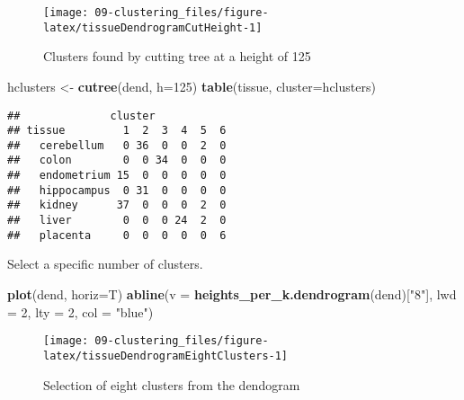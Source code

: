 \documentclass[]{book}
\newenvironment{Shaded}{\begin{snugshade}}{\end{snugshade}}
\newcommand{\KeywordTok}[1]{\textcolor[rgb]{0.13,0.29,0.53}{\textbf{{#1}}}}
\newcommand{\DataTypeTok}[1]{\textcolor[rgb]{0.13,0.29,0.53}{{#1}}}
\newcommand{\DecValTok}[1]{\textcolor[rgb]{0.00,0.00,0.81}{{#1}}}
\newcommand{\StringTok}[1]{\textcolor[rgb]{0.31,0.60,0.02}{{#1}}}
\newcommand{\NormalTok}[1]{{#1}}
\theoremstyle{definition}
\theoremstyle{definition}
\theoremstyle{definition}
\theoremstyle{remark}
\begin{document}
\begin{figure}

{\centering \texttt{[image: 09-clustering\_files/figure-latex/tissueDendrogramCutHeight-1]} 

}

\caption{Clusters found by cutting tree at a height of 125}\label{fig:tissueDendrogramCutHeight}
\end{figure}

\begin{Shaded}
\begin{Highlighting}[]
\NormalTok{hclusters <-}\StringTok{ }\KeywordTok{cutree}\NormalTok{(dend, }\DataTypeTok{h=}\DecValTok{125}\NormalTok{)}
\KeywordTok{table}\NormalTok{(tissue, }\DataTypeTok{cluster=}\NormalTok{hclusters)}
\end{Highlighting}
\end{Shaded}

\begin{verbatim}
##              cluster
## tissue         1  2  3  4  5  6
##   cerebellum   0 36  0  0  2  0
##   colon        0  0 34  0  0  0
##   endometrium 15  0  0  0  0  0
##   hippocampus  0 31  0  0  0  0
##   kidney      37  0  0  0  2  0
##   liver        0  0  0 24  2  0
##   placenta     0  0  0  0  0  6
\end{verbatim}

Select a specific number of clusters.

\begin{Shaded}
\begin{Highlighting}[]
\KeywordTok{plot}\NormalTok{(dend, }\DataTypeTok{horiz=}\NormalTok{T)}
\KeywordTok{abline}\NormalTok{(}\DataTypeTok{v =} \KeywordTok{heights_per_k.dendrogram}\NormalTok{(dend)[}\StringTok{"8"}\NormalTok{], }\DataTypeTok{lwd =} \DecValTok{2}\NormalTok{, }\DataTypeTok{lty =} \DecValTok{2}\NormalTok{, }\DataTypeTok{col =} \StringTok{"blue"}\NormalTok{)}
\end{Highlighting}
\end{Shaded}

\begin{figure}

{\centering \texttt{[image: 09-clustering\_files/figure-latex/tissueDendrogramEightClusters-1]} 

}

\caption{Selection of eight clusters from the dendogram}\label{fig:tissueDendrogramEightClusters}
\end{figure}
\end{document}
